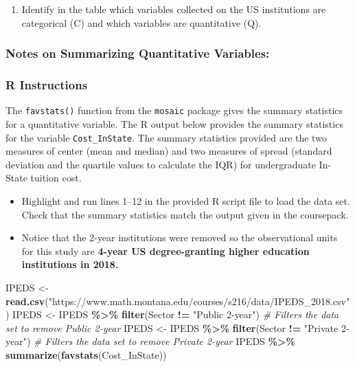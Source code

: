 \documentclass[
]{report}
\newenvironment{Shaded}{\begin{snugshade}}{\end{snugshade}}
\newcommand{\CommentTok}[1]{\textcolor[rgb]{0.56,0.35,0.01}{\textit{#1}}}
\newcommand{\FunctionTok}[1]{\textcolor[rgb]{0.13,0.29,0.53}{\textbf{#1}}}
\newcommand{\NormalTok}[1]{#1}
\newcommand{\OtherTok}[1]{\textcolor[rgb]{0.56,0.35,0.01}{#1}}
\newcommand{\SpecialCharTok}[1]{\textcolor[rgb]{0.81,0.36,0.00}{\textbf{#1}}}
\newcommand{\StringTok}[1]{\textcolor[rgb]{0.31,0.60,0.02}{#1}}
\providecommand{\tightlist}{%
  \setlength{\itemsep}{0pt}\setlength{\parskip}{0pt}}
\begin{document}
\begin{enumerate}
\def\labelenumi{\arabic{enumi}.}
\tightlist
\item
  Identify in the table which variables collected on the US institutions are categorical (C) and which variables are quantitative (Q).
\end{enumerate}

\subsubsection*{Notes on Summarizing Quantitative Variables:}\label{notes-on-summarizing-quantitative-variables}

\vspace{2.8in}

\subsubsection*{R Instructions}\label{r-instructions-3}

The \texttt{favstats()} function from the \texttt{mosaic} package gives the summary statistics for a quantitative variable. The R output below provides the summary statistics for the variable \texttt{Cost\_InState}. The summary statistics provided are the two measures of center (mean and median) and two measures of spread (standard deviation and the quartile values to calculate the IQR) for undergraduate In-State tuition cost.

\begin{itemize}
\item
  Highlight and run lines 1--12 in the provided R script file to load the data set. Check that the summary statistics match the output given in the coursepack.
\item
  Notice that the 2-year institutions were removed so the observational units for this study are \textbf{4-year US degree-granting higher education institutions in 2018.}
\end{itemize}

\begin{Shaded}
\begin{Highlighting}[]
\NormalTok{IPEDS }\OtherTok{\textless{}{-}} \FunctionTok{read.csv}\NormalTok{(}\StringTok{"https://www.math.montana.edu/courses/s216/data/IPEDS\_2018.csv"}\NormalTok{) }
\NormalTok{IPEDS }\OtherTok{\textless{}{-}}\NormalTok{ IPEDS }\SpecialCharTok{\%\textgreater{}\%}
  \FunctionTok{filter}\NormalTok{(Sector }\SpecialCharTok{!=} \StringTok{"Public 2{-}year"}\NormalTok{) }\CommentTok{\# Filters the data set to remove Public 2{-}year}
\NormalTok{IPEDS }\OtherTok{\textless{}{-}}\NormalTok{ IPEDS }\SpecialCharTok{\%\textgreater{}\%}
  \FunctionTok{filter}\NormalTok{(Sector }\SpecialCharTok{!=} \StringTok{"Private 2{-}year"}\NormalTok{) }\CommentTok{\# Filters the data set to remove Private 2{-}year}
\NormalTok{IPEDS }\SpecialCharTok{\%\textgreater{}\%}
    \FunctionTok{summarize}\NormalTok{(}\FunctionTok{favstats}\NormalTok{(Cost\_InState))}
\end{Highlighting}
\end{Shaded}
\end{document}
